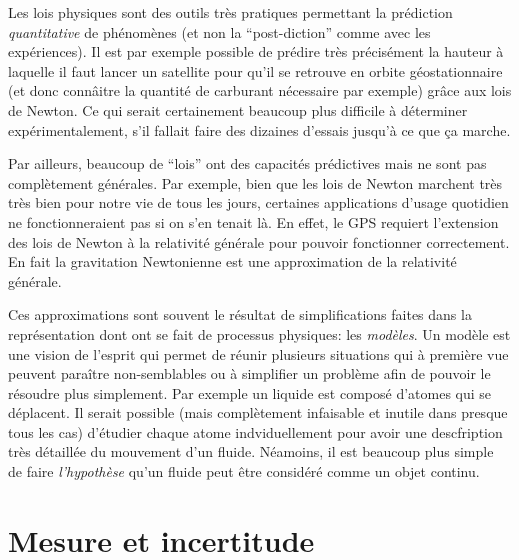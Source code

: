 \documentclass[a4paper,12pt]{book}
\begin{document}
Les lois physiques sont des outils très pratiques permettant la prédiction \textit{quantitative} 
de phénomènes (et non la ``post-diction'' comme avec les expériences). Il est par exemple possible de prédire très précisément la hauteur à laquelle il faut lancer un satellite 
pour qu'il se retrouve en orbite géostationnaire (et donc connâitre la quantité de carburant nécessaire par exemple) grâce aux lois de Newton. 
Ce qui serait certainement beaucoup plus difficile à déterminer expérimentalement, s'il fallait faire des dizaines d'essais jusqu'à ce que ça marche.

Par ailleurs, beaucoup de ``lois'' ont des capacités prédictives mais ne sont pas complètement générales. Par exemple, bien que les lois de Newton 
marchent très très bien pour notre vie de tous les jours, certaines applications d'usage quotidien ne fonctionneraient pas si on s'en tenait là. 
En effet, le GPS requiert l'extension des lois de Newton à la relativité générale pour pouvoir fonctionner correctement. En fait
la gravitation Newtonienne est une approximation de la relativité générale.

Ces approximations sont souvent le résultat de simplifications faites dans la représentation dont ont se fait 
de processus physiques: les \textit{modèles}. Un modèle est une vision de l'esprit qui permet de réunir plusieurs
situations qui à première vue peuvent paraître non-semblables ou à simplifier un problème afin de pouvoir le résoudre plus simplement. 
Par exemple un liquide est composé d'atomes qui se déplacent. Il serait possible (mais complètement infaisable et inutile dans presque tous les cas) 
d'étudier chaque atome indviduellement pour avoir une descfription très détaillée du mouvement d'un fluide. Néamoins, il est beaucoup plus simple de 
faire \textit{l'hypothèse} qu'un fluide peut être considéré comme un objet continu.

\section{Mesure et incertitude}
\end{document}
